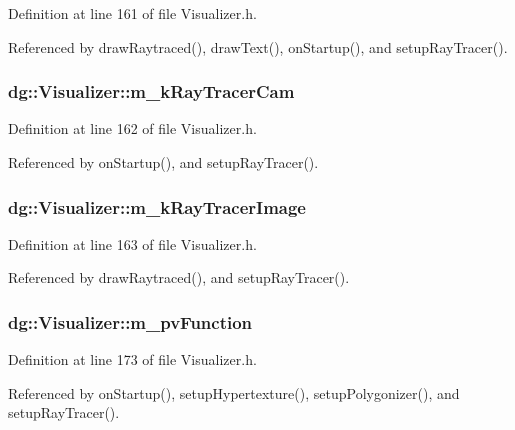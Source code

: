 Definition at line 161 of file Visualizer.h.

Referenced by draw\-Raytraced(), draw\-Text(), on\-Startup(), and setup\-Ray\-Tracer().
\subsubsection{ dg::Visualizer::m\_\-k\-Ray\-Tracer\-Cam\hspace{0.3cm}{\tt  [protected]}}\label{classdg_1_1Visualizer_n46}




Definition at line 162 of file Visualizer.h.

Referenced by on\-Startup(), and setup\-Ray\-Tracer().
\subsubsection{ dg::Visualizer::m\_\-k\-Ray\-Tracer\-Image\hspace{0.3cm}{\tt  [protected]}}\label{classdg_1_1Visualizer_n47}




Definition at line 163 of file Visualizer.h.

Referenced by draw\-Raytraced(), and setup\-Ray\-Tracer().
\subsubsection{ dg::Visualizer::m\_\-pv\-Function\hspace{0.3cm}{\tt  [protected]}}\label{classdg_1_1Visualizer_n53}




Definition at line 173 of file Visualizer.h.

Referenced by on\-Startup(), setup\-Hypertexture(), setup\-Polygonizer(), and setup\-Ray\-Tracer().
